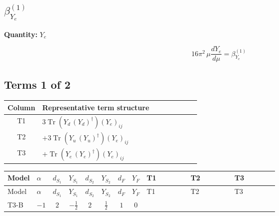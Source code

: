 \documentclass[8pt]{article}
\begin{document}
\begin{landscape}
\section*{$\beta_{Y_e}^{(1)}$}
\noindent\textbf{Quantity: }$Y_e$\par\smallskip
\[16\pi^2\,\mu\frac{d Y_e}{d\mu}=\beta_{Y_e}^{(1)}\]
\subsection*{Terms 1 of 2}
\begin{center}
\begin{tabular}{@{}c >{\raggedright\arraybackslash}p{0.82\linewidth}@{}}
\toprule
Column & Representative term structure \\
\midrule
T1 & \(\displaystyle 3 \operatorname{Tr}\!\left({Y_d}\,\left({Y_d}\right)^{\dagger}\right) \left({Y_e}\right)_{ij}\) \\
\midrule
T2 & \(\displaystyle +3 \operatorname{Tr}\!\left({Y_u}\,\left({Y_u}\right)^{\dagger}\right) \left({Y_e}\right)_{ij}\) \\
\midrule
T3 & \(\displaystyle +\operatorname{Tr}\!\left({Y_e}\,\left({Y_e}\right)^{\dagger}\right) \left({Y_e}\right)_{ij}\) \\
\midrule
\bottomrule
\end{tabular}
\end{center}
\smallskip
\tiny
\begin{longtable}{@{}llcccccc >{\raggedright\arraybackslash}p{0.21\linewidth} >{\raggedright\arraybackslash}p{0.21\linewidth} >{\raggedright\arraybackslash}p{0.21\linewidth}@{}}
\toprule
Model & $\alpha$ & $d_{S_1}$ & $Y_{S_1}$ & $d_{S_2}$ & $Y_{S_2}$ & $d_F$ & $Y_F$ & T1 & T2 & T3 \\
\midrule
\endfirsthead
\toprule
Model & $\alpha$ & $d_{S_1}$ & $Y_{S_1}$ & $d_{S_2}$ & $Y_{S_2}$ & $d_F$ & $Y_F$ & T1 & T2 & T3 \\
\midrule
\endhead
T3-B & $-1$ & $2$ & $-\frac{1}{2}$ & $2$ & $\frac{1}{2}$ & $1$ & $0$ & \scriptsize\adjustbox{max width=\linewidth}{$\begin{gathered} 3 \operatorname{Tr}\!\left({Y_d}\,\left({Y_d}\right)^{\dagger}\right) \left({Y_e}\right)_{ij}\end{gathered}$} & \scriptsize\adjustbox{max width=\linewidth}{$\begin{gathered} +3 \operatorname{Tr}\!\left({Y_u}\,\left({Y_u}\right)^{\dagger}\right) \left({Y_e}\right)_{ij}\end{gathered}$} & \scriptsize\adjustbox{max width=\linewidth}{$\begin{gathered} +\operatorname{Tr}\!\left({Y_e}\,\left({Y_e}\right)^{\dagger}\right) \left({Y_e}\right)_{ij}\end{gathered}$} \\

\end{longtable}
\end{landscape}
\end{document}
